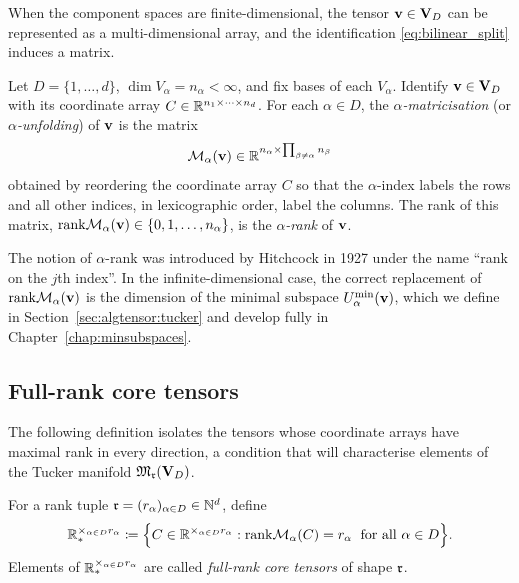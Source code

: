 When the component spaces are finite-dimensional, the tensor $\mathbf{v} \in \mathbf{V}_D$
can be represented as a multi-dimensional array, and the identification
\eqref{eq:bilinear_split} induces a matrix.

\begin{definition}
\label{def:matricisation}
Let $D = \{1, \ldots, d\}$, $\dim V_\alpha = n_\alpha < \infty$, and
fix bases of each $V_\alpha$. Identify $\mathbf{v} \in \mathbf{V}_D$ with its
coordinate array $C \in \mathbb{R}^{n_1 \times \cdots \times n_d}$.
For each $\alpha \in D$, the \emph{$\alpha$-matricisation} (or
\emph{$\alpha$-unfolding}) of $\mathbf{v}$ is the matrix
\begin{equation*}
    \mathcal{M}_{\alpha}(\mathbf{v}) \in \mathbb{R}^{n_\alpha \times \prod_{\beta \neq \alpha} n_\beta}
\end{equation*}
obtained by reordering the coordinate array $C$ so that the $\alpha$-index
labels the rows and all other indices, in lexicographic order, label the
columns. The rank of this matrix,
$\mathrm{rank} \mathcal{M}_{\alpha}(\mathbf{v}) \in \{0, 1, \ldots, n_\alpha\}$,
is the \emph{$\alpha$-rank} of $\mathbf{v}$.
\end{definition}

The notion of $\alpha$-rank was introduced by Hitchcock
\cite[p.\,170]{Hitchcock1927} in 1927 under the name ``rank on the $j$th
index''. In the infinite-dimensional case, the correct replacement of
$\mathrm{rank} \mathcal{M}_{\alpha}(\mathbf{v})$ is the dimension of the minimal subspace
$U^{\min}_{\alpha}(\mathbf{v})$, which we define in Section~\ref{sec:algtensor:tucker}
and develop fully in Chapter~\ref{chap:minsubspaces}.

\subsection*{Full-rank core tensors}

The following definition isolates the tensors whose coordinate arrays
have maximal rank in every direction, a condition that will characterise
elements of the Tucker manifold $\mathfrak{M}_{\mathfrak{r}}(\mathbf{V}_D)$.

\begin{definition}
\label{def:fullrank_core}
For a rank tuple $\mathfrak{r} = (r_\alpha)_{\alpha \in D} \in \mathbb{N}^d$, define
\begin{equation}
\label{eq:Rstar}
    \mathbb{R}^{\times_{\alpha \in D} r_\alpha}_*
    \coloneqq
    \Bigl\{
        C \in \mathbb{R}^{\times_{\alpha \in D} r_\alpha} :
        \mathrm{rank} \mathcal{M}_{\alpha}(C) = r_\alpha \;\text{ for all } \alpha \in D
    \Bigr\}.
\end{equation}
Elements of $\mathbb{R}^{\times_{\alpha \in D} r_\alpha}_*$ are called
\emph{full-rank core tensors} of shape $\mathfrak{r}$.
\end{definition}

